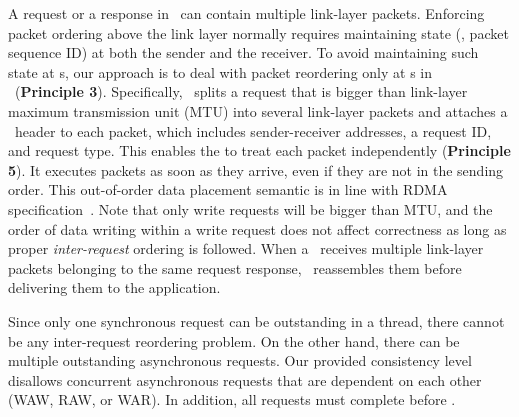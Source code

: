 A request or a response in \sys\ can contain multiple link-layer packets. 
Enforcing packet ordering above the link layer normally requires maintaining state (\eg, packet sequence ID) at both the sender and the receiver.
To avoid maintaining such state at \MN{}s,
our approach is to deal with packet reordering only at \CN{}s in \syslib\ (\textbf{Principle 3}).
Specifically, \syslib\ splits a request that is bigger than link-layer maximum transmission unit (MTU) into several link-layer packets
and attaches a \sys\ header to each packet, which includes sender-receiver addresses, a request ID, and request type.
This enables the \MN{} to treat each packet independently (\textbf{Principle 5}).
It executes packets as soon as they arrive, even if they are not in the sending order.
This out-of-order data placement semantic is in line with RDMA specification~\cite{IRN}. 
Note that only write requests will be bigger than MTU, and the order of data writing within a write request does not affect correctness as long as proper {\em inter-request} ordering is followed.
When a \CN\ receives multiple link-layer packets belonging to the same request response, 
\syslib\ reassembles them before delivering them to the application.


Since only one synchronous request can be outstanding in a thread, there cannot be any inter-request reordering problem.
On the other hand, there can be multiple outstanding asynchronous requests.
Our provided consistency level disallows concurrent asynchronous requests that are dependent on each other (WAW, RAW, or WAR).
In addition, all requests must complete before \release.

